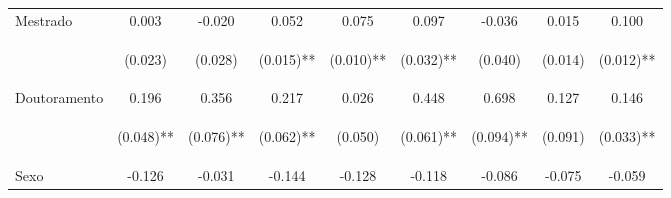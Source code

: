 \documentclass[12pt,a4paper]{article}
\begin{document}
\begin{table}[h]
\begin{tabular}{lcccccccc}
  \noalign{\smallskip}
  Mestrado     & 0.003 & -0.020 & 0.052 & 0.075 & 0.097 & -0.036 & 0.015 & 0.100 \\
  &\begin{scriptsize}(0.023)\end{scriptsize} &\begin{scriptsize}(0.028)\end{scriptsize} &\begin{scriptsize}(0.015)**\end{scriptsize} & \begin{scriptsize}(0.010)**\end{scriptsize} & \begin{scriptsize}(0.032)**\end{scriptsize} & \begin{scriptsize}(0.040)\end{scriptsize} & \begin{scriptsize}(0.014)\end{scriptsize} & \begin{scriptsize}(0.012)**\end{scriptsize}\\
  Doutoramento & 0.196 & 0.356 & 0.217 & 0.026 & 0.448 & 0.698 & 0.127 & 0.146 \\
  & \begin{scriptsize}(0.048)**\end{scriptsize} &\begin{scriptsize}(0.076)**\end{scriptsize} & \begin{scriptsize}(0.062)**\end{scriptsize} & \begin{scriptsize}(0.050)\end{scriptsize} & \begin{scriptsize}(0.061)**\end{scriptsize} & \begin{scriptsize}(0.094)**\end{scriptsize} & \begin{scriptsize}(0.091)\end{scriptsize} & \begin{scriptsize}(0.033)**\end{scriptsize}\\
  Sexo         & -0.126 & -0.031 & -0.144 & -0.128 & -0.118 & -0.086 & -0.075 & -0.059 \\

\end{tabular}
\end{table}
\end{document}
